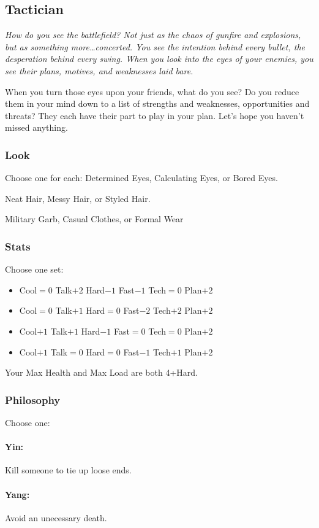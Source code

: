 \subsection{Tactician}
{\itshape How do you see the battlefield? Not just as the chaos of
  gunfire and explosions, but as something more\ldots concerted. You
  see the intention behind every bullet, the desperation behind every
  swing. When you look into the eyes of your enemies, you see their
  plans, motives, and weaknesses laid bare.

When you turn those eyes upon your friends, what do you see? Do you
reduce them in your mind down to a list of strengths and weaknesses,
opportunities and threats? They each have their part to play in your
plan. Let's hope you haven't missed anything.}
\subsubsection{Look}
Choose one for each:
Determined Eyes, Calculating Eyes, or Bored Eyes.

Neat Hair, Messy Hair, or Styled Hair.

Military Garb, Casual Clothes, or Formal Wear

\subsubsection{Stats}
Choose one set:
\begin{itemize}
\setlength\itemsep{0em}
\item Cool${=}0$ Talk$+2$ Hard$-1$ Fast$-1$ Tech${=}0$ Plan$+2$
\item Cool${=}0$ Talk$+1$ Hard${=}0$ Fast$-2$ Tech$+2$ Plan$+2$
\item Cool$+1$ Talk$+1$ Hard$-1$ Fast${=}0$ Tech${=}0$ Plan$+2$
\item Cool$+1$ Talk${=}0$ Hard${=}0$ Fast$-1$ Tech$+1$ Plan$+2$
\end{itemize}

Your Max Health and Max Load are both 4+Hard.

\subsubsection{Philosophy}
Choose one:
\paragraph{Yin:} Kill someone to tie up loose ends.
\paragraph{Yang:} Avoid an unecessary death.

